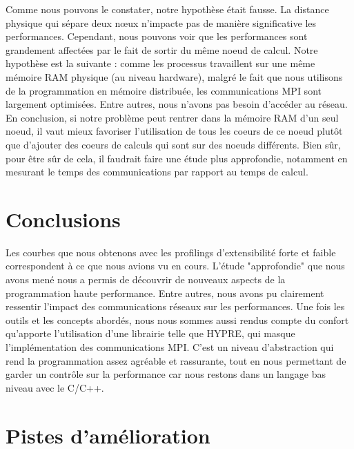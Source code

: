 \documentclass[10pt,twocolumn,letterpaper]{article}
\begin{document}
Comme nous pouvons le constater, notre hypothèse était fausse. La distance
physique qui sépare deux nœux n'impacte pas de manière significative les
performances. Cependant, nous pouvons voir que les performances sont
grandement affectées par le fait de sortir du même noeud de calcul.
Notre hypothèse est la suivante : comme les processus travaillent sur une
même mémoire RAM physique (au niveau hardware), malgré le fait que nous
utilisons de la programmation en mémoire distribuée, les communications MPI
sont largement optimisées. Entre autres, nous n'avons pas besoin d'accéder
au réseau. En conclusion, si notre problème peut rentrer dans la mémoire RAM
d'un seul noeud, il vaut mieux favoriser l'utilisation de tous les coeurs de
ce noeud plutôt que d'ajouter des coeurs de calculs qui sont sur des noeuds
différents. Bien sûr, pour être sûr de cela, il faudrait faire une étude plus
approfondie, notamment en mesurant le temps des communications par rapport au
temps de calcul.

\section*{Conclusions}

Les courbes que nous obtenons avec les profilings d'extensibilité forte et
faible correspondent à ce que nous avions vu en cours.
L'étude "approfondie"
que nous avons mené nous a permis de découvrir de nouveaux aspects de la
programmation haute performance. Entre autres, nous avons pu clairement
ressentir l'impact des communications réseaux sur les performances.
Une fois les outils et les concepts abordés, nous nous sommes aussi
rendus compte du confort qu'apporte l'utilisation
d'une librairie telle que HYPRE,
qui masque l'implémentation des communications MPI. C'est un niveau
d'abstraction qui rend la programmation assez agréable et rassurante, tout en
nous permettant de garder un contrôle sur la performance
car nous restons dans un langage bas niveau avec le C/C++.

\section*{Pistes d'amélioration}
\end{document}
